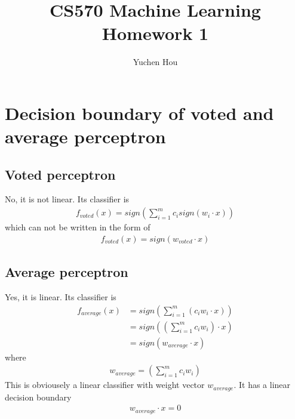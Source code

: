 \documentclass[12pt]{article}
\begin{document}
\title{CS570 Machine Learning Homework 1}
\author{Yuchen Hou}
\maketitle

\section{Decision boundary of voted and average perceptron}
\subsection{Voted perceptron}
No, it is not linear. Its classifier is
\begin{align}
  f_{voted}(x) = sign (\sum_{i=1}^m c_i sign(w_i \cdot x))
\end{align}
which can not be written in the form of
\begin{align}
  f_{voted}(x)= sign (w_{voted} \cdot x)
\end{align}
\subsection{Average perceptron}
Yes, it is linear. Its classifier is
\begin{align}
  f_{average}(x)
  &= sign (\sum_{i=1}^m (c_i w_i \cdot x))\\
  &= sign ((\sum_{i=1}^m c_i w_i) \cdot x)\\
  &= sign (w_{average} \cdot x)
\end{align}
where
\begin{align}
  w_{average} = (\sum_{i=1}^m c_i w_i)
\end{align}
This is obviousely a linear classifier with weight vector $w_{average}$. It has a linear decision boundary
\begin{align}
  w_{average} \cdot x = 0
\end{align}
\end{document}
